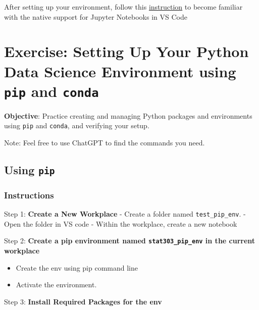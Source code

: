 \documentclass[
  letterpaper,
  DIV=11,
  numbers=noendperiod]{scrreprt}
\providecommand{\tightlist}{%
  \setlength{\itemsep}{0pt}\setlength{\parskip}{0pt}}\usepackage{longtable,booktabs,array}
\begin{document}
After setting up your environment, follow this
\href{https://code.visualstudio.com/docs/datascience/jupyter-notebooks}{instruction}
to become familiar with the native support for Jupyter Notebooks in VS
Code

\hypertarget{exercise-setting-up-your-python-data-science-environment-using-pip-and-conda}{%
\section{\texorpdfstring{Exercise: Setting Up Your Python Data Science
Environment using \texttt{pip} and
\texttt{conda}}{Exercise: Setting Up Your Python Data Science Environment using pip and conda}}\label{exercise-setting-up-your-python-data-science-environment-using-pip-and-conda}}

\textbf{Objective}: Practice creating and managing Python packages and
environments using \texttt{pip} and \texttt{conda}, and verifying your
setup.

Note: Feel free to use ChatGPT to find the commands you need.

\hypertarget{using-pip}{%
\subsection{\texorpdfstring{Using
\texttt{pip}}{Using pip}}\label{using-pip}}

\hypertarget{instructions}{%
\subsubsection{Instructions}\label{instructions}}

Step 1: \textbf{Create a New Workplace} - Create a folder named
\texttt{test\_pip\_env}. - Open the folder in VS code - Within the
workplace, create a new notebook

Step 2: \textbf{Create a pip environment named
\texttt{stat303\_pip\_env} in the current workplace}

\begin{itemize}
\tightlist
\item
  Create the env using pip command line
\item
  Activate the environment.
\end{itemize}

Step 3: \textbf{Install Required Packages for the env}
\end{document}
